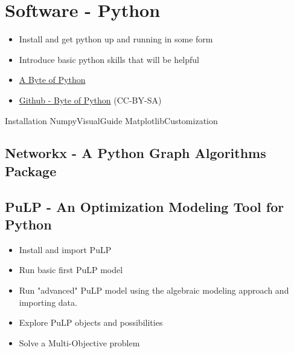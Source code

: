 \chapter{Software - Python}
\begin{outcome}
\begin{itemize}
\item Install and get python up and running in some form
\item Introduce basic python skills that will be helpful
\end{itemize}
\end{outcome}

\begin{resource}
\begin{itemize}
\item\href{https://open.umn.edu/opentextbooks/textbooks/a-byte-of-python}{A Byte of Python}
\item\href{https://github.com/swaroopch/byte-of-python}{Github - Byte of Python} (CC-BY-SA)
\end{itemize}
\end{resource}

{Installation} %
{NumpyVisualGuide} %
{MatplotlibCustomization} %

\section{Networkx - A Python Graph Algorithms Package}


\section{PuLP - An Optimization Modeling Tool for Python}
\begin{outcome}
\begin{itemize}
\item Install and import PuLP
\item Run basic first PuLP model
\item Run "advanced" PuLP model using the algebraic modeling approach and importing data.
\item Explore PuLP objects and possibilities
\item Solve a Multi-Objective problem
\end{itemize}
\end{outcome}


